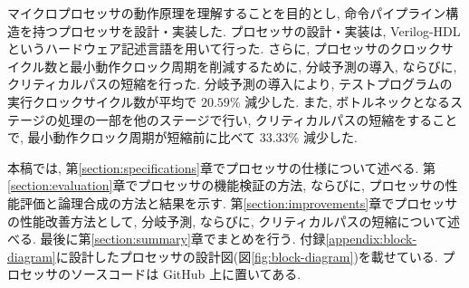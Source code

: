 \documentclass[../main.tex]{subfiles}
\begin{document}

  マイクロプロセッサの動作原理を理解することを目的とし, 
  命令パイプライン構造を持つプロセッサを設計・実装した.
  プロセッサの設計・実装は, Verilog-HDL というハードウェア記述言語を用いて行った.
  さらに, プロセッサのクロックサイクル数と最小動作クロック周期を削減するために, 
  分岐予測の導入, ならびに, クリティカルパスの短縮を行った.
  分岐予測の導入により, テストプログラムの実行クロックサイクル数が平均で $20.59\%$ 減少した.
  また, ボトルネックとなるステージの処理の一部を他のステージで行い, 
  クリティカルパスの短縮をすることで, 
  最小動作クロック周期が短縮前に比べて $33.33\%$ 減少した.

  本稿では, 第\ref{section:specifications}章でプロセッサの仕様について述べる.
  第\ref{section:evaluation}章でプロセッサの機能検証の方法, ならびに, プロセッサの性能評価と論理合成の方法と結果を示す.
  第\ref{section:improvements}章でプロセッサの性能改善方法として, 分岐予測, ならびに, クリティカルパスの短縮について述べる.
  最後に第\ref{section:summary}章でまとめを行う.
  付録\ref{appendix:block-diagram}に設計したプロセッサの設計図(図\ref{fig:block-diagram})を載せている.
  プロセッサのソースコードは GitHub \footnotemark 上に置いてある.
\end{document}
